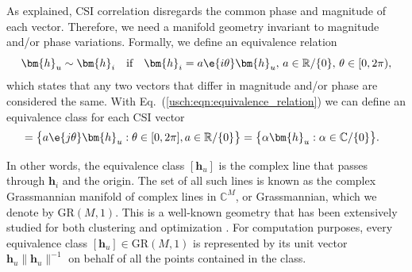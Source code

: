 
As explained, CSI correlation disregards the common phase and magnitude of each vector. 
Therefore, we need a manifold geometry invariant to magnitude and/or phase variations. Formally, we define an equivalence relation \begin{equation}
	\bm{h}_u\sim\bm{h}_i\quad\text{if}\quad\bm{h}_i=a\e{i\theta}\bm{h}_u,\,a\in\mathbb{R}/\{0\},\,\theta\in[0,2\pi), \label{usch:eqn:equivalence_relation}
\end{equation}  
which states that any two vectors that differ in magnitude and/or phase are considered the same. With Eq.~(\ref{usch:eqn:equivalence_relation}) we can define an equivalence class for each CSI vector
\begin{align}
	[\bm{h}_u]&=\big\{a\e{j\theta}\bm{h}_u:\theta\in[0,2\pi], a\in\mathbb{R}/\{0\}\big\}
	=\big\{\alpha\bm{h}_u:\alpha\in\mathbb{C}/\{0\}\big\}.\label{usch:eqn:equivalence_class}
\end{align}

In other words, the equivalence class $[\bm{h}_u]$ is the complex line that passes through $\bm{h}_i$ and the origin. The set of all such lines is known as the 
complex Grassmannian manifold of complex lines in $\mathbb{C}^M$, or Grassmannian, which we denote by $\mathrm{GR}(M,1)$. This is a well-known geometry that has been extensively studied for both clustering and optimization \cite{Stiverson2019gkm,Edelman1999stiefel,Boumal2015grassmann}. 
For computation purposes, every equivalence class $[\bm{h}_u]\in\mathrm{GR}(M,1)$ is represented by its unit vector $\bm{h}_u\|\bm{h}_u\|^{-1}$ on behalf of all the points contained in the class.

